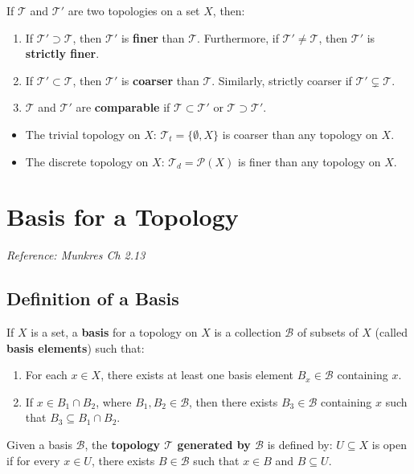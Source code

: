 \documentclass[11pt]{report}
\begin{document}
\begin{defbox}
If $\mathcal{T}$ and $\mathcal{T}'$ are two topologies on a set $X$, then:
\begin{enumerate}
    \item If $\mathcal{T}' \supset \mathcal{T}$, then $\mathcal{T}'$ is \textbf{finer} than $\mathcal{T}$. Furthermore, if $\mathcal{T}' \neq \mathcal{T}$, then $\mathcal{T}'$ is \textbf{strictly finer}.
    \item If $\mathcal{T}' \subset \mathcal{T}$, then $\mathcal{T}'$ is \textbf{coarser} than $\mathcal{T}$. Similarly, strictly coarser if $\mathcal{T}' \subsetneq \mathcal{T}$.
    \item $\mathcal{T}$ and $\mathcal{T}'$ are \textbf{comparable} if $\mathcal{T} \subset \mathcal{T}'$ or $\mathcal{T} \supset \mathcal{T}'$.
\end{enumerate}
\end{defbox}

\begin{exbox}
\begin{itemize}
    \item The trivial topology on $X$: $\mathcal{T}_t = \{\emptyset, X\}$ is coarser than any topology on $X$.
    \item The discrete topology on $X$: $\mathcal{T}_d = \mathcal{P}(X)$ is finer than any topology on $X$.
\end{itemize}
\end{exbox}

\section{Basis for a Topology}

\textit{Reference: Munkres Ch 2.13}

\subsection{Definition of a Basis}

\begin{defbox}
If $X$ is a set, a \textbf{basis} for a topology on $X$ is a collection $\mathcal{B}$ of subsets of $X$ (called \textbf{basis elements}) such that:
\begin{enumerate}
    \item For each $x \in X$, there exists at least one basis element $B_x \in \mathcal{B}$ containing $x$.
    \item If $x \in B_1 \cap B_2$, where $B_1, B_2 \in \mathcal{B}$, then there exists $B_3 \in \mathcal{B}$ containing $x$ such that $B_3 \subseteq B_1 \cap B_2$.
\end{enumerate}
Given a basis $\mathcal{B}$, the \textbf{topology $\mathcal{T}$ generated by $\mathcal{B}$} is defined by: $U \subseteq X$ is open if for every $x \in U$, there exists $B \in \mathcal{B}$ such that $x \in B$ and $B \subseteq U$.
\end{defbox}
\end{document}

